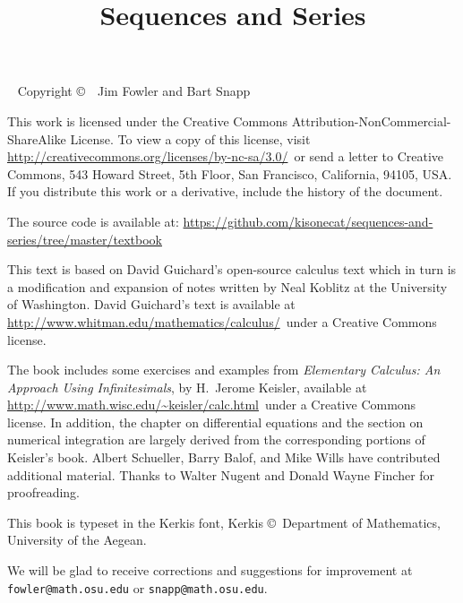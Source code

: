 \documentclass[justified]{tufte-book}
\title{Sequences and Series}
\begin{document}
\frontmatter

\maketitle

\pagebreak


\begin{fullwidth}
~\vfill
\thispagestyle{empty}
\setlength{\parindent}{0pt}
\setlength{\parskip}{\baselineskip}
Copyright \copyright\ \the\year\ Jim Fowler and Bart Snapp

This work is licensed under the Creative Commons
Attribution-NonCommercial-ShareAlike License. To view a copy of this
license, visit
\url{http://creativecommons.org/licenses/by-nc-sa/3.0/}~or send a
letter to Creative Commons, 543 Howard Street, 5th Floor, San
Francisco, California, 94105, USA. If you distribute this work or a
derivative, include the history of the document. 

The source code is available
at: \url{https://github.com/kisonecat/sequences-and-series/tree/master/textbook}

\noindent
This text is based on David Guichard's open-source calculus text which
in turn is a modification and expansion of notes written by Neal
Koblitz at the University of Washington. David Guichard's text is
available at \url{http://www.whitman.edu/mathematics/calculus/}~under a Creative Commons license.

\noindent The book includes some exercises and examples from {\it
  Elementary Calculus: An Approach Using Infinitesimals}, by H.~Jerome
Keisler, available at
\url{http://www.math.wisc.edu/~keisler/calc.html}~under a Creative
Commons license. In addition, the chapter on differential equations
and the section on numerical integration are largely derived from the
corresponding portions of Keisler's book.  Albert Schueller, Barry
Balof, and Mike Wills have contributed additional material.  Thanks to Walter Nugent and Donald Wayne Fincher for proofreading.

\noindent This book is typeset in the Kerkis font, 
Kerkis \copyright~Department of Mathematics, University of the Aegean.


\noindent We will be glad to receive corrections and suggestions for
improvement at \texttt{fowler@math.osu.edu} or
\texttt{snapp@math.osu.edu}.

\end{fullwidth}
\end{document}
